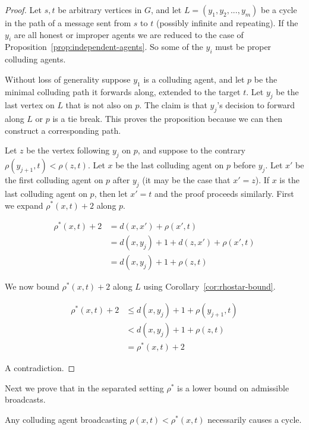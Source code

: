 \documentclass{comnet}
\begin{document}
\begin{proof}

Let $s,t$ be arbitrary vertices in $G$, and let $L = (y_1, y_2, ..., y_m)$ be a
cycle in the path of a message sent from $s$ to $t$ (possibly infinite and
repeating). If the $y_i$ are all honest or improper agents we are reduced to
the case of Proposition~\ref{prop:independent-agents}. So some of the $y_i$
must be proper colluding agents. 

Without loss of generality suppose $y_1$ is a colluding agent, and let $p$ be
the minimal colluding path it forwards along, extended to the target $t$.  Let
$y_j$ be the last vertex on $L$ that is not also on $p$. The claim is that
$y_j$'s decision to forward along $L$ or $p$ is a tie break. This proves the
proposition because we can then construct a corresponding path. 

Let $z$ be the vertex following $y_j$ on $p$, and suppose to the contrary
$\rho(y_{j+1}, t) < \rho(z,t)$. Let $x$ be the last colluding agent on $p$
before $y_j$. Let $x'$ be the first colluding agent on $p$ after $y_j$ (it may
be the case that $x' = z$). If $x$ is the last colluding agent on $p$, then let
$x'=t$ and the proof proceeds similarly. First we expand $\rho^*(x,t) + 2$
along $p$.

\begin{align*}
   \rho^*(x,t) + 2 &= d(x,x') + \rho(x',t) \\  
                   &= d(x,y_j) + 1 + d(z,x') + \rho(x',t) \\
                   &= d(x,y_j) + 1 + \rho(z,t)
\end{align*}

We now bound $\rho^*(x,t) + 2$ along $L$ using
Corollary~\ref{cor:rhostar-bound}. 

\begin{align*}
   \rho^*(x,t) + 2 &\leq d(x, y_j) + 1 + \rho(y_{j+1}, t) \\  
                   &< d(x, y_j) + 1 + \rho(z,t) \\ 
                   &= \rho^*(x,t) + 2
\end{align*}

A contradiction.
\end{proof}

Next we prove that in the separated setting $\rho^*$ is a lower bound on
admissible broadcasts. 

\begin{proposition} \label{prop:rhostar-lower-bound}

Any colluding agent broadcasting $\rho(x,t) < \rho^*(x,t)$ necessarily causes a
cycle.

\end{proposition}
\end{document}
